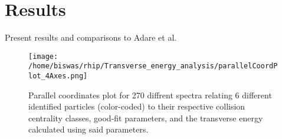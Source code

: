 \chapter{Results} \label{ch:results}
Present results and comparisons to Adare et al.

	\begin{figure}[h]
	  \centering
	  \texttt{[image: /home/biswas/rhip/Transverse\_energy\_analysis/parallelCoordPlot\_4Axes.png]}
	  \caption{Parallel coordinates plot for 270 diffrent spectra relating 6 different identified particles (color-coded) to their respective collision centrality classes, good-fit parameters, and the transverse energy calculated using said parameters.\cite{2007PhRvL..98p2301A}}\label{fig:v2Scaling1}
	\end{figure}


